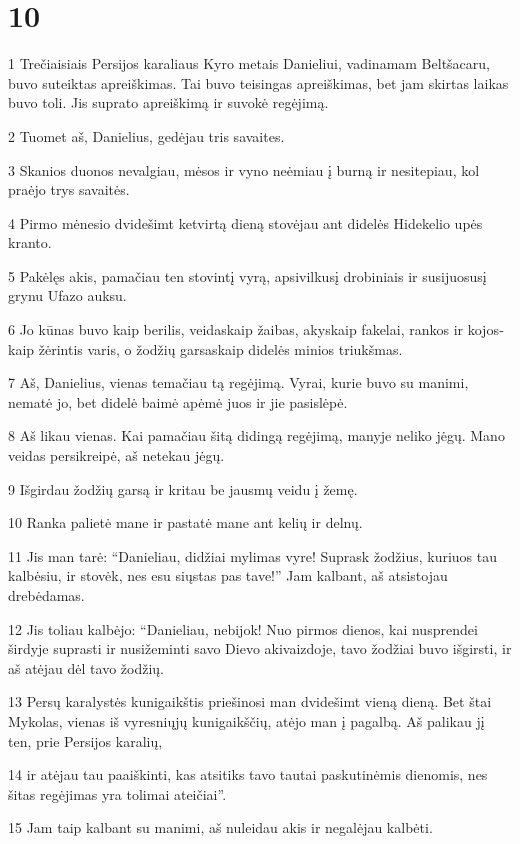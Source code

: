 \chapter{10}


\par 1 Trečiaisiais Persijos karaliaus Kyro metais Danieliui, vadinamam Beltšacaru, buvo suteiktas apreiškimas. Tai buvo teisingas apreiškimas, bet jam skirtas laikas buvo toli. Jis suprato apreiškimą ir suvokė regėjimą. 
\par 2 Tuomet aš, Danielius, gedėjau tris savaites. 
\par 3 Skanios duonos nevalgiau, mėsos ir vyno neėmiau į burną ir nesitepiau, kol praėjo trys savaitės. 
\par 4 Pirmo mėnesio dvidešimt ketvirtą dieną stovėjau ant didelės Hidekelio upės kranto. 
\par 5 Pakėlęs akis, pamačiau ten stovintį vyrą, apsivilkusį drobiniais ir susijuosusį grynu Ufazo auksu. 
\par 6 Jo kūnas buvo kaip berilis, veidas­kaip žaibas, akys­kaip fakelai, rankos ir kojos­kaip žėrintis varis, o žodžių garsas­kaip didelės minios triukšmas. 
\par 7 Aš, Danielius, vienas temačiau tą regėjimą. Vyrai, kurie buvo su manimi, nematė jo, bet didelė baimė apėmė juos ir jie pasislėpė. 
\par 8 Aš likau vienas. Kai pamačiau šitą didingą regėjimą, manyje neliko jėgų. Mano veidas persikreipė, aš netekau jėgų. 
\par 9 Išgirdau žodžių garsą ir kritau be jausmų veidu į žemę. 
\par 10 Ranka palietė mane ir pastatė mane ant kelių ir delnų. 
\par 11 Jis man tarė: “Danieliau, didžiai mylimas vyre! Suprask žodžius, kuriuos tau kalbėsiu, ir stovėk, nes esu siųstas pas tave!” Jam kalbant, aš atsistojau drebėdamas. 
\par 12 Jis toliau kalbėjo: “Danieliau, nebijok! Nuo pirmos dienos, kai nusprendei širdyje suprasti ir nusižeminti savo Dievo akivaizdoje, tavo žodžiai buvo išgirsti, ir aš atėjau dėl tavo žodžių. 
\par 13 Persų karalystės kunigaikštis priešinosi man dvidešimt vieną dieną. Bet štai Mykolas, vienas iš vyresniųjų kunigaikščių, atėjo man į pagalbą. Aš palikau jį ten, prie Persijos karalių, 
\par 14 ir atėjau tau paaiškinti, kas atsitiks tavo tautai paskutinėmis dienomis, nes šitas regėjimas yra tolimai ateičiai”. 
\par 15 Jam taip kalbant su manimi, aš nuleidau akis ir negalėjau kalbėti. 
